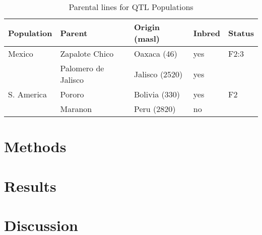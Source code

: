 \documentclass[11pt]{article}
\begin{document}
\begin{table}
\begin{center}
\caption{Parental lines for QTL Populations} \label{tab:qtlpops}
\begin{tabular}{lllll}
\\\toprule  
\rowcolor{white}
{\bf Population}	& {\bf Parent } &	{\bf Origin (masl)} &  {\bf Inbred } & {\bf Status }\\ \midrule
\rowcolor{gray!25}
Mexico	& Zapalote Chico		& Oaxaca	 (46)	& yes	&  F2:3 \\ 
\rowcolor{gray!25}
	& 	Palomero de Jalisco	& 	Jalisco (2520)	& yes	& \\
S. America	& Pororo	& Bolivia (330)	& yes &  F2 \\ 
\rowcolor{white}
	& Maranon	 & Peru (2820) & no & \\ \bottomrule
\end{tabular}
\end{center}
\end{table} 


\section*{Methods}

\section*{Results}

\section*{Discussion}


\end{document}
